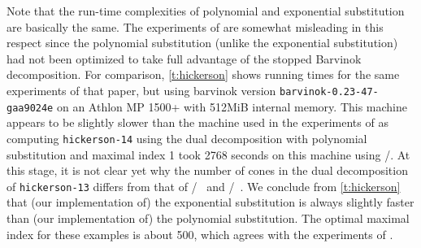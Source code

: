 Note that the run-time complexities of polynomial and exponential
substitution are basically the same.  The experiments of
 are somewhat misleading in this respect
since the polynomial substitution (unlike the exponential
substitution) had not been optimized to take full
advantage of the stopped Barvinok decomposition.
For comparison, \autoref{t:hickerson} shows running times
for the same experiments of that paper, but using
barvinok version \verb+barvinok-0.23-47-gaa9024e+
on an Athlon MP 1500+ with 512MiB internal memory.
This machine appears to be slightly slower than the
machine used in the experiments of 
as computing {\tt hickerson-14} using the dual decomposition
with polynomial substitution and maximal index 1
took 2768 seconds on this machine using \LattEmk/.
At this stage, it is not clear yet why the number of
cones in the dual decomposition of {\tt hickerson-13}
differs from that of \LattE/~ and
\LattEmk/~\cite{latte-macchiato}.
We conclude from \autoref{t:hickerson} that (our implementation of)
the exponential substitution is always slightly faster than
(our implementation of) the polynomial substitution.
The optimal maximal index for these examples is about 500,
which agrees with the experiments of .

